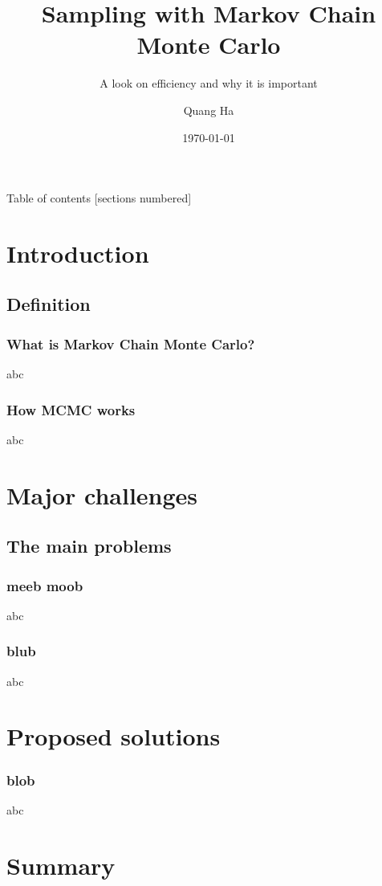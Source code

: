 \documentclass[10pt]{beamer}
\title{Sampling with Markov Chain Monte Carlo}
\subtitle{A look on efficiency and why it is important}
\date{\today}
\author{Quang Ha}
\begin{document}
\maketitle

\begin{frame}[plain]{Table of contents}
	[sections numbered]
	\tableofcontents[hideallsubsections]
\end{frame}	

\section{Introduction}
\subsection{Definition}

\begin{frame}
	\frametitle{What is Markov Chain Monte Carlo?}
	abc
\end{frame} 


\begin{frame}
	\frametitle{How MCMC works}
	abc
\end{frame} 


\section{Major challenges}
\subsection{The main problems}

\begin{frame}
	\frametitle{meeb moob}
	abc
\end{frame}

\begin{frame}
	\frametitle{blub}
	abc
\end{frame}

\section{Proposed solutions}
\begin{frame}
	\frametitle{blob}
	abc
\end{frame}

\section{Summary}
\begin{frame}
\end{frame}
	
\end{document}
